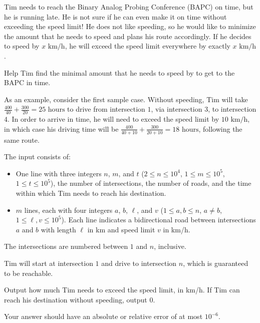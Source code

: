 

Tim needs to reach the Binary Analog Probing Conference (BAPC) on time, but he is running late.
He is not sure if he can even make it on time without exceeding the speed limit!
He does not like speeding, so he would like to minimize the amount that he needs to speed and plans his route accordingly.
If he decides to speed by $x\text{~km/h}$, he will exceed the speed limit everywhere by exactly $x\text{~km/h}$.

Help Tim find the minimal amount that he needs to speed by to get to the BAPC in time.

As an example, consider the first sample case.
Without speeding, Tim will take $\frac{400}{40} + \frac{300}{20} = 25\text{~hours}$
to drive from intersection $1$, via intersection $3$, to intersection $4$.
In order to arrive in time, he will need to exceed the speed limit by $10\text{~km/h}$,
in which case his driving time will be $\frac{400}{40+10} + \frac{300}{20+10} = 18\text{~hours}$,
following the same route.

\begin{Input}
    The input consists of:
    \begin{itemize}
        \item One line with three integers $n$, $m$, and $t$
            ($2 \leq n \leq 10^4$, $1 \leq m \leq 10^5$, $1 \leq t \leq 10^5$),
            the number of intersections,
            the number of roads,
            and the time within which Tim needs to reach his destination.
        \item $m$ lines, each with four integers $a$, $b$, $\ell$, and $v$
        ($1 \leq a, b \leq n$, $a \neq b$, $1 \leq \ell, v \leq 10^5$).
        Each line indicates a bidirectional road between intersections $a$ and $b$ with length $\ell$ in km and speed limit $v$ in km/h.
    \end{itemize}
    The intersections are numbered between $1$ and $n$, inclusive.

    Tim will start at intersection $1$ and drive to intersection $n$, which is guaranteed to be reachable.
\end{Input}

\begin{Output}
    Output how much Tim needs to exceed the speed limit, in km/h.
    If Tim can reach his destination without speeding, output $0$.

    Your answer should have an absolute or relative error of at most $10^{-6}$.
\end{Output}
